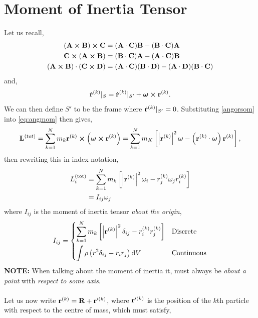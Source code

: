 \documentclass{book}
\begin{document}
\section{Moment of Inertia Tensor}
Let us recall,
\begin{align}
    (\vb{A}\cross\vb{B})\cross\vb{C} & = (\vb{A}\cdot \vb{C})\vb{B} - (\vb{B}\cdot \vb{C})\vb{A} \\
    \vb{C}\cross(\vb{A}\cross\vb{B}) & = (\vb{B}\cdot\vb{C})\vb{A} - (\vb{A}\cdot \vb{C})\vb{B} \\
    (\vb{A}\cross\vb{B})\cdot(\vb{C}\cross\vb{D}) &= (\vb{A}\cdot\vb{C})(\vb{B}\cdot\vb{D}) - (\vb{A}\cdot\vb{D})(\vb{B}\cdot\vb{C})
\end{align}
and,
\begin{equation}
    \Dot{\vb{r}}^{(k)}|_S = \Dot{\vb{r}}^{(k)}|_{S'} + \vb*{\omega}\cross\vb{r}^{(k)}. \label{angorsom}
\end{equation}
We can then define $S'$ to be the frame where $\Dot{\vb{r}}^{(k)}|_{S'} = 0$. Substituting \eqref{angorsom} into \eqref{eq:angmom} then gives,
\begin{equation}
    \vb{L}^{(tot)} = \sum_{k=1}^Nm_k\vb{r}^{(k)}\cross\left(\vb*{\omega}\cross\vb{r}^{(k)}\right) = \sum_{k=1}^Nm_K\left[\left|\vb{r}^{(k)}\right|^2\vb*{\omega} - \left(\vb{r}^{(k)}\cdot\vb*{\omega}\right)\vb{r}^{(k)}\right],
\end{equation}
then rewriting this in index notation,
\begin{equation}
    \begin{split}
        L_i^{(\text{tot})} & = \sum_{k=1}^Nm_k\left[\left|\vb{r}^{(k)}\right|^2\omega_i - r_j^{(k)}\omega_jr_i^{(k)}\right] \\
        & = I_{ij}\omega_j
    \end{split}
\end{equation}
where $I_{ij}$ is the moment of inertia tensor \textit{about the origin}, 
\begin{equation}
    I_{ij} = \begin{dcases}
        \sum_{k=1}^Nm_k\left[\left|\vb{r}^{(k)}\right|^2\delta_{ij} - r_i^{(k)}r_j^{(k)}\right] & \text{Discrete} \\
        \int \rho\left(r^2\delta_{ij} - r_ir_j\right)\dd{V} & \text{Continuous}
    \end{dcases}
\end{equation}
\textbf{NOTE:} When talking about the moment of inertia it, must always be \textit{about a point} with \textit{respect to some axis}.
\\\\Let us now write $\vb{r}^{(k)} = \vb{R} +\vb{r}'^{(k)}$, where $\vb{r}'^{(k)}$ is the position of the $k$th particle with respect to the centre of mass, which must satisfy,
\end{document}
